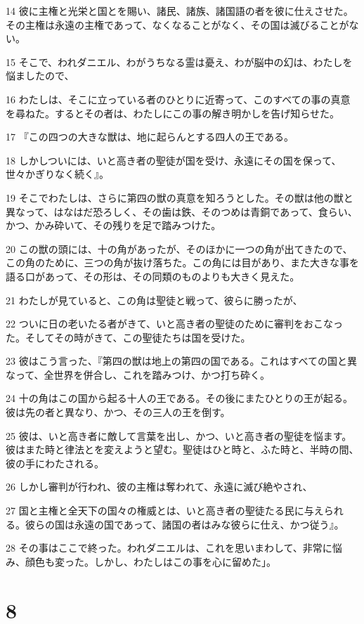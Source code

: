 \par 14 彼に主権と光栄と国とを賜い、諸民、諸族、諸国語の者を彼に仕えさせた。その主権は永遠の主権であって、なくなることがなく、その国は滅びることがない。
\par 15 そこで、われダニエル、わがうちなる霊は憂え、わが脳中の幻は、わたしを悩ましたので、
\par 16 わたしは、そこに立っている者のひとりに近寄って、このすべての事の真意を尋ねた。するとその者は、わたしにこの事の解き明かしを告げ知らせた。
\par 17 『この四つの大きな獣は、地に起らんとする四人の王である。
\par 18 しかしついには、いと高き者の聖徒が国を受け、永遠にその国を保って、世々かぎりなく続く』。
\par 19 そこでわたしは、さらに第四の獣の真意を知ろうとした。その獣は他の獣と異なって、はなはだ恐ろしく、その歯は鉄、そのつめは青銅であって、食らい、かつ、かみ砕いて、その残りを足で踏みつけた。
\par 20 この獣の頭には、十の角があったが、そのほかに一つの角が出てきたので、この角のために、三つの角が抜け落ちた。この角には目があり、また大きな事を語る口があって、その形は、その同類のものよりも大きく見えた。
\par 21 わたしが見ていると、この角は聖徒と戦って、彼らに勝ったが、
\par 22 ついに日の老いたる者がきて、いと高き者の聖徒のために審判をおこなった。そしてその時がきて、この聖徒たちは国を受けた。
\par 23 彼はこう言った、『第四の獣は地上の第四の国である。これはすべての国と異なって、全世界を併合し、これを踏みつけ、かつ打ち砕く。
\par 24 十の角はこの国から起る十人の王である。その後にまたひとりの王が起る。彼は先の者と異なり、かつ、その三人の王を倒す。
\par 25 彼は、いと高き者に敵して言葉を出し、かつ、いと高き者の聖徒を悩ます。彼はまた時と律法とを変えようと望む。聖徒はひと時と、ふた時と、半時の間、彼の手にわたされる。
\par 26 しかし審判が行われ、彼の主権は奪われて、永遠に滅び絶やされ、
\par 27 国と主権と全天下の国々の権威とは、いと高き者の聖徒たる民に与えられる。彼らの国は永遠の国であって、諸国の者はみな彼らに仕え、かつ従う』。
\par 28 その事はここで終った。われダニエルは、これを思いまわして、非常に悩み、顔色も変った。しかし、わたしはこの事を心に留めた」。

\chapter{8}

